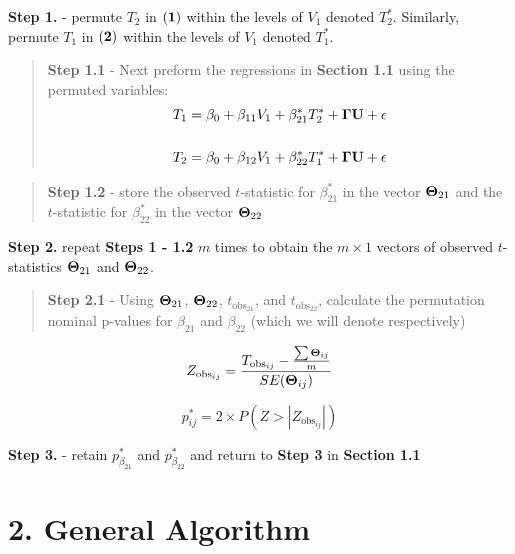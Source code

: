 \documentclass[12pt]{report}
\begin{document}
\noindent \textbf{Step 1.} - permute $T_2$ in $\bf (1)$ within the levels of $V_1$ denoted $T_2^{\ast}$. Similarly, permute $T_1$ in $\bf (2)$ within the levels of $V_1$ denoted $T_1^{\ast}$.
 
\begin{quote}
\textbf{Step 1.1} - Next preform the regressions in \textbf{Section 1.1} using the permuted variables:
\begin{eqnarray}
T_1 = \beta_0 +\beta_{11}V_1+\beta_{21}^{\ast}T_2^{\ast}+{\bf \Gamma U}+ \epsilon \\
\nonumber\\
T_2 = \beta_0 +\beta_{12}V_1+\beta_{22}^{\ast}T_1^{\ast}+{\bf \Gamma U}+ \epsilon 
\end{eqnarray}
\end{quote}

\begin{quote}
\textbf{Step 1.2} - store the observed $t$-statistic for $\beta_{21}^{\ast}$ in the vector ${\bf \Theta}_{21}$ and the $t$-statistic for $\beta_{22}^{\ast}$ in the vector ${\bf \Theta}_{22}$
\end{quote}

\noindent \textbf{Step 2.} repeat \textbf{Steps 1 - 1.2} $m$ times to obtain the $m \times 1$ vectors of observed $t$-statistics ${\bf \Theta}_{21}$ and ${\bf \Theta}_{22}$. \\

\begin{quote}
\textbf{Step 2.1} - Using ${\bf \Theta}_{21}$, ${\bf \Theta}_{22}$, $t_{\text{obs}_{21}}$, and $t_{\text{obs}_{22}}$, calculate the permutation nominal p-values for $\beta_{21}$ and $\beta_{22}$ (which we will denote  respectively)
\end{quote}

\[ Z_{\text{obs}_{ij}} = \frac{T_{\text{obs}_{ij}} - \frac{\sum {\bf \Theta}_{ij}}{m} }{SE({\bf \Theta}_{ij})} \]

\[ p^{\ast}_{ij} = 2\times P(Z >  |Z_{\text{obs}_{ij}}|) \]


\noindent \textbf{Step 3.} - retain $p_{\beta_{21}}^{\ast}$ and $p_{\beta_{22}}^{\ast}$ and return to \textbf{Step 3} in \textbf{Section 1.1} \\


\section*{2. General Algorithm}
\end{document}
